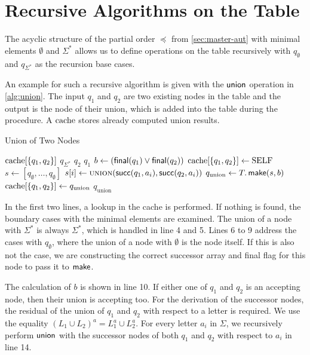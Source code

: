 \section{Recursive Algorithms on the Table}
The acyclic structure of the partial order $\preceq$ from \autoref{sec:master-aut} with minimal elements $\emptyset$ and $\Sigma^{*}$ allows us to define operations on the table recursively with $q_{\emptyset}$ and $q_{\Sigma^{*}}$ as the recursion base cases.
\par
An example for such a recursive algorithm is given with the $\operatorname{\textsf{union}}$ operation in \autoref{alg:union}. The input $q_{1}$ and $q_{2}$ are two existing nodes in the table and the output is the node of their union, which is added into the table during the procedure. A $\mathrm{cache}$ stores already computed union results.
\begin{algorithm}[H]
\caption{Union of Two Nodes}\label{alg:union}
\begin{algorithmic}[1]\smallskip
{}
\If{$\cache[\{q_{1},q_{2}\}]$}
	\Return $\cache[\{q_{1},q_{2}\}]$
	\Return $q_{\Sigma^{*}}$
	\Return $q_{2}$
	\Return $q_{1}$
\EndIf
\State $b \gets (\operatorname{\textsf{final}}(q_{1}) \lor \operatorname{\textsf{final}}(q_{2}))$
\State $\mathrm{cache}[\{q_{1},q_{2}\}] \gets \text{SELF}$
\State $s \gets [q_{\emptyset},\dots,q_{\emptyset}]$
\State $s[i] \gets \Call{union}{\Succ(q_{1},a_{i}),\Succ(q_{2},a_{i})}$
\EndFor
\State $q_{\text{union}} \gets T.\operatorname{\textsf{make}}(s,b)$
\State $\mathrm{cache}[\{q_{1},q_{2}\}] \gets q_{\text{union}}$
\Return $q_{\text{union}}$
\EndProcedure
\end{algorithmic}
\end{algorithm}
In the first two lines, a lookup in the cache is performed. If nothing is found, the boundary cases with the minimal elements are examined. The union of a node with $\Sigma^{*}$ is always $\Sigma^{*}$, which is handled in line 4 and 5. Lines 6 to 9 address the cases with $q_{\emptyset}$, where the union of a node with $\emptyset$ is the node itself. 
If this is also not the case, we are constructing the correct successor array and final flag for this node to pass it to $\operatorname{\textsf{make}}$. 

\par 

The calculation of $b$ is shown in line 10. If either one of $q_{1}$ and $q_{2}$ is an accepting node, then their union is accepting too. For the derivation of the successor nodes, the residual of the union of $q_{1}$ and $q_{2}$ with respect to a letter is required. We use the equality $(L_{1} \cup L_{2})^{a} = L_{1}^{a} \cup L_{2}^{a}$. For every letter $a_{i}$ in $\Sigma$, we recursively perform $\operatorname{\textsf{union}}$ with the successor nodes of both $q_{1}$ and $q_{2}$ with respect to $a_{i}$ in line 14.

